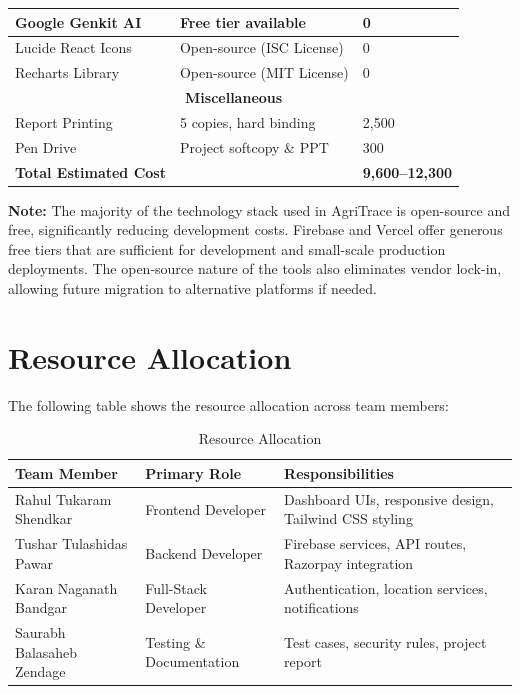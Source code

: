 \documentclass[a4paper,12pt,oneside]{report}
\begin{document}
\begin{table}[h!]
\begin{tabular}{|p{5cm}|p{4cm}|p{3cm}|}
\hline
Google Genkit AI & Free tier available & 0 \\
\hline
Lucide React Icons & Open-source (ISC License) & 0 \\
\hline
Recharts Library & Open-source (MIT License) & 0 \\
\hline
\multicolumn{3}{|c|}{\textbf{Miscellaneous}} \\
\hline
Report Printing & 5 copies, hard binding & 2,500 \\
\hline
Pen Drive & Project softcopy \& PPT & 300 \\
\hline
\hline
\textbf{Total Estimated Cost} & & \textbf{9,600--12,300} \\
\hline
\end{tabular}
\end{table}

\noindent \textbf{Note:} The majority of the technology stack used in AgriTrace is open-source and free, significantly reducing development costs. Firebase and Vercel offer generous free tiers that are sufficient for development and small-scale production deployments. The open-source nature of the tools also eliminates vendor lock-in, allowing future migration to alternative platforms if needed.

\section{Resource Allocation}

\noindent The following table shows the resource allocation across team members:

\begin{table}[h!]
\centering
\caption{Resource Allocation}
\label{tab:resources}
\begin{tabular}{|p{3cm}|p{4cm}|p{5cm}|}
\hline
\textbf{Team Member} & \textbf{Primary Role} & \textbf{Responsibilities} \\
\hline
Rahul Tukaram Shendkar & Frontend Developer & Dashboard UIs, responsive design, Tailwind CSS styling \\
\hline
Tushar Tulashidas Pawar & Backend Developer & Firebase services, API routes, Razorpay integration \\
\hline
Karan Naganath Bandgar & Full-Stack Developer & Authentication, location services, notifications \\
\hline
Saurabh Balasaheb Zendage & Testing \& Documentation & Test cases, security rules, project report \\
\hline
\end{tabular}
\end{table}
\end{document}
